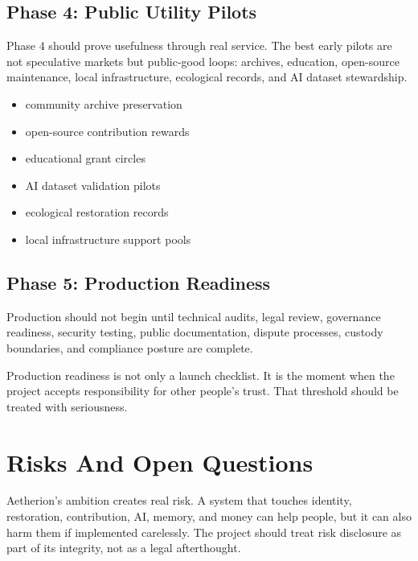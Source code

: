 \documentclass[12pt]{article}
\begin{document}
\subsection{Phase 4: Public Utility Pilots}

Phase 4 should prove usefulness through real service. The best early pilots are not speculative markets but public-good loops: archives, education, open-source maintenance, local infrastructure, ecological records, and AI dataset stewardship.

\begin{itemize}
  \item community archive preservation
  \item open-source contribution rewards
  \item educational grant circles
  \item AI dataset validation pilots
  \item ecological restoration records
  \item local infrastructure support pools
\end{itemize}

\subsection{Phase 5: Production Readiness}

Production should not begin until technical audits, legal review, governance readiness, security testing, public documentation, dispute processes, custody boundaries, and compliance posture are complete.

Production readiness is not only a launch checklist. It is the moment when the project accepts responsibility for other people's trust. That threshold should be treated with seriousness.

\section{Risks And Open Questions}

Aetherion's ambition creates real risk. A system that touches identity, restoration, contribution, AI, memory, and money can help people, but it can also harm them if implemented carelessly. The project should treat risk disclosure as part of its integrity, not as a legal afterthought.
\end{document}
